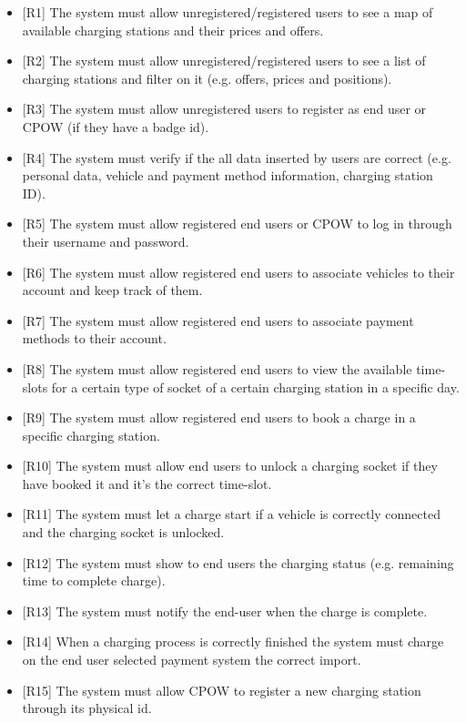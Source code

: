 \documentclass[a4paper]{report}
\begin{document}
\begin{itemize}
    \item{[R1]} \label{R1} The system must allow unregistered/registered users to see a map of available charging stations and their prices and offers.
    \item{[R2]} \label{R2} The system must allow unregistered/registered users to see a list of charging stations and filter on it (e.g. offers, prices and positions).
    \item{[R3]} \label{R3} The system must allow unregistered users to register as end user or CPOW (if they have a badge id).
    \item{[R4]} \label{R4} The system must verify if the all data inserted by users are correct (e.g. personal data, vehicle and payment method information, charging station ID).   
    \item{[R5]} \label{R5} The system must allow registered end users or CPOW to log in through their username and password.
    \item{[R6]} \label{R6} The system must allow registered end users to associate vehicles to their account and keep track of them.
    \item{[R7]} \label{R7} The system must allow registered end users to associate payment methods to their account.
    \item{[R8]} \label{R8} The system must allow registered end users to view the available time-slots for a certain type of socket of a certain charging station in a specific day.
    \item{[R9]} \label{R9} The system must allow registered end users to book a charge in a specific charging station.
    \item{[R10]} \label{R10} The system must allow end users to unlock a charging socket if they have booked it and it's the correct time-slot.
    \item{[R11]} \label{R11} The system must let a charge start if a vehicle is correctly connected and the charging socket is unlocked.
    \item{[R12]} \label{R12} The system must show to end users the charging status (e.g. remaining time to complete charge).
    \item{[R13]} \label{R13} The system must notify the end-user when the charge is complete.
    \item{[R14]} \label{R14} When a charging process is correctly finished the system must charge on the end user selected payment system the correct import.
    \item{[R15]} \label{R15} The system must allow CPOW to register a new charging station through its physical id.

\end{itemize}
\end{document}
